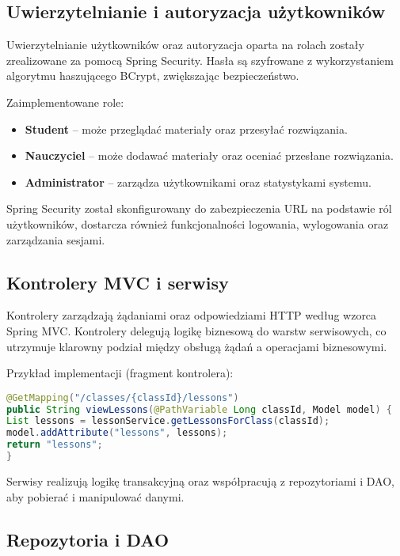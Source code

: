 \subsection{Uwierzytelnianie i autoryzacja użytkowników}

Uwierzytelnianie użytkowników oraz autoryzacja oparta na rolach zostały zrealizowane za pomocą Spring Security. Hasła są szyfrowane z wykorzystaniem algorytmu haszującego BCrypt, zwiększając bezpieczeństwo.

Zaimplementowane role:

\begin{itemize}
\item \textbf{Student} – może przeglądać materiały oraz przesyłać rozwiązania.
\item \textbf{Nauczyciel} – może dodawać materiały oraz oceniać przesłane rozwiązania.
\item \textbf{Administrator} – zarządza użytkownikami oraz statystykami systemu.
\end{itemize}

Spring Security został skonfigurowany do zabezpieczenia URL na podstawie ról użytkowników, dostarcza również funkcjonalności logowania, wylogowania oraz zarządzania sesjami.

\subsection{Kontrolery MVC i serwisy}

Kontrolery zarządzają żądaniami oraz odpowiedziami HTTP według wzorca Spring MVC. Kontrolery delegują logikę biznesową do warstw serwisowych, co utrzymuje klarowny podział między obsługą żądań a operacjami biznesowymi.

Przykład implementacji (fragment kontrolera):

\begin{lstlisting}[language=Java]
@GetMapping("/classes/{classId}/lessons")
public String viewLessons(@PathVariable Long classId, Model model) {
List lessons = lessonService.getLessonsForClass(classId);
model.addAttribute("lessons", lessons);
return "lessons";
}
\end{lstlisting}

Serwisy realizują logikę transakcyjną oraz współpracują z repozytoriami i DAO, aby pobierać i manipulować danymi.

\subsection{Repozytoria i DAO}

